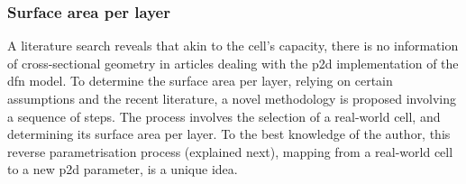 \subsubsection*{Surface area per layer}\label{sec:surfareaperlayer}

A  literature search  reveals that  akin  to the  cell's capacity,  there is  no
information of cross-sectional  geometry in articles dealing  with the \gls{p2d}
implementation of the \gls{dfn} model. To  determine the surface area per layer,
relying on  certain assumptions and  the recent literature, a novel  methodology
is proposed involving  a sequence  of steps.  The process  involves the
selection  of a real-world  cell, and  determining  its  surface area  per 
layer.  To the  best knowledge of the author, this  reverse parametrisation
process (explained next), mapping from a real-world cell to a new \gls{p2d}
parameter, is a unique idea.

